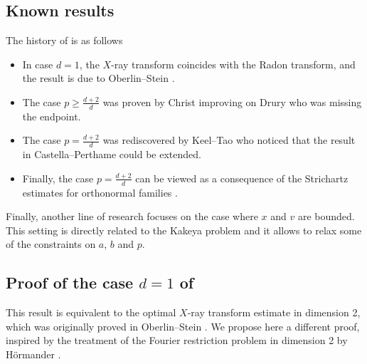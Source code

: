 \documentclass[11pt,a4paper,reqno]{amsart}
\theoremstyle{plain}
\theoremstyle{remark}
\begin{document}
\subsection{Known results}

The history of  is as follows
\begin{itemize}
    \item In case $d=1$, the $X$-ray transform coincides with the Radon transform, and the result is due to Oberlin--Stein \cite{OberlinStein}.
    \item The case $p \geq \frac{d+2}{d}$ was proven by Christ \cite{Christ} improving on Drury \cite{Drury} who was missing the endpoint.
    \item The case $p = \frac{d+2}{d}$ was rediscovered by Keel--Tao \cite{keelTao1998} who noticed that the result in Castella--Perthame \cite{CastellaPerthame1996} could be extended.
    \item Finally, the case $p=\frac{d+2}{d}$ can be viewed as a consequence of the Strichartz estimates for orthonormal families \cite{Sabin}.
\end{itemize}

Finally, another line of research \cite{LabaTao,Wolff,Oberlin} focuses on the case where $x$ and $v$ are bounded. This setting is directly related to the Kakeya problem and it allows to relax some of the constraints on $a$, $b$ and $p$.

\subsection{Proof of the case \texorpdfstring{$d=1$}{d=1} of }

This result is equivalent to the optimal $X$-ray transform estimate in dimension 2, which was originally proved in Oberlin--Stein \cite{OberlinStein}. We propose here a different proof, inspired by the treatment of the Fourier restriction problem in dimension 2 by H\"ormander \cite{Hormander}.

\medskip
\end{document}
